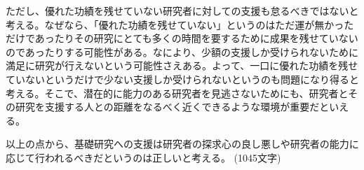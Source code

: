 \documentclass[platex,a4paper,12pt,dvipdfmx]{jsarticle}
\begin{document}
ただし、優れた功績を残せていない研究者に対しての支援も怠るべきではないと考える。なぜなら、「優れた功績を残せていない」というのはただ運が無かっただけであったりその研究にとても多くの時間を要するために成果を残せていないのであったりする可能性がある。なにより、少額の支援しか受けられないために満足に研究が行えないという可能性さえある。よって、一口に優れた功績を残せていないというだけで少ない支援しか受けられないというのも問題になり得ると考える。そこで、潜在的に能力のある研究者を見逃さないためにも、研究者とその研究を支援する人との距離をなるべく近くできるような環境が重要だといえる。

以上の点から、基礎研究への支援は研究者の探求心の良し悪しや研究者の能力に応じて行われるべきだというのは正しいと考える。
(1045文字)
\end{document}
